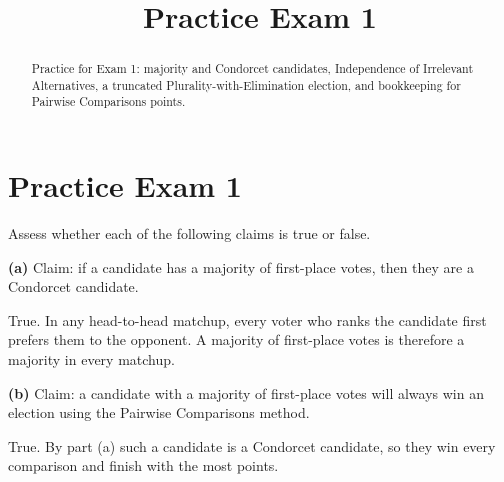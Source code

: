 \documentclass[12pt]{ximera}
\title{Practice Exam 1}
\begin{document}
\begin{abstract}
Practice for Exam 1: majority and Condorcet candidates, Independence of Irrelevant
Alternatives, a truncated Plurality-with-Elimination election, and bookkeeping for
Pairwise Comparisons points.
\end{abstract}
\maketitle

\section*{Practice Exam 1}

\begin{problem}
Assess whether each of the following claims is true or false.

\begin{prompt}
\textbf{(a)} Claim: if a candidate has a majority of first-place votes, then they are a
Condorcet candidate.

\begin{multipleChoice}
\end{multipleChoice}

\begin{feedback}
True. In any head-to-head matchup, every voter who ranks the candidate first prefers
them to the opponent. A majority of first-place votes is therefore a majority in every
matchup.
\end{feedback}
\end{prompt}

\begin{prompt}
\textbf{(b)} Claim: a candidate with a majority of first-place votes will always win an
election using the Pairwise Comparisons method.

\begin{multipleChoice}
\end{multipleChoice}

\begin{feedback}
True. By part (a) such a candidate is a Condorcet candidate, so they win every
comparison and finish with the most points.
\end{feedback}
\end{prompt}
\end{problem}
\end{document}
